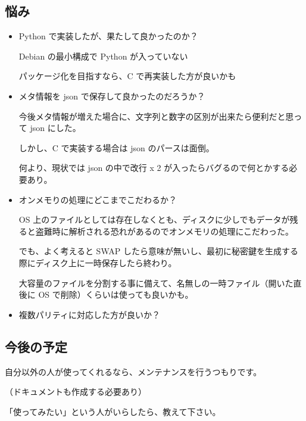 \documentclass[mingoth,a4paper]{jsarticle}
\begin{document}

\subsection{悩み}
\begin{itemize}
\item Python で実装したが、果たして良かったのか？

  Debian の最小構成で Python が入っていない

  パッケージ化を目指すなら、C で再実装した方が良いかも
\item メタ情報を json で保存して良かったのだろうか？

  今後メタ情報が増えた場合に、文字列と数字の区別が出来たら便利だと思って json にした。

  しかし、C で実装する場合は json のパースは面倒。

  何より、現状では json の中で改行 x 2 が入ったらバグるので何とかする必要あり。
\item オンメモりの処理にどこまでこだわるか？

  OS 上のファイルとしては存在しなくとも、ディスクに少しでもデータが残ると盗難時に解析される恐れがあるのでオンメモリの処理にこだわった。

  でも、よく考えると SWAP したら意味が無いし、最初に秘密鍵を生成する際にディスク上に一時保存したら終わり。

  大容量のファイルを分割する事に備えて、名無しの一時ファイル（開いた直後に OS で削除）くらいは使っても良いかも。
\item 複数パリティに対応した方が良いか？
\end{itemize}

\subsection{今後の予定}

自分以外の人が使ってくれるなら、メンテナンスを行うつもりです。

（ドキュメントも作成する必要あり）

「使ってみたい」という人がいらしたら、教えて下さい。
\end{document}
